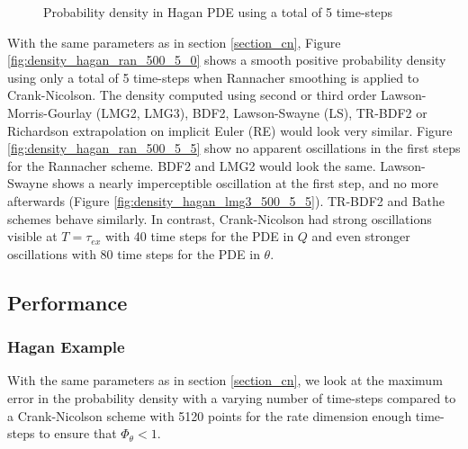 \documentclass[]{rAMF2e}
\begin{document}
\begin{figure}[htb]
\begin{center}
  \end{center}
     \caption{\label{fig:density_hagan_lmg2_500_10} Probability density in Hagan PDE using a total of 5 time-steps}
\end{figure}
With the same parameters as in section \ref{section_cn}, Figure \ref{fig:density_hagan_ran_500_5_0} shows a smooth positive probability density using only a total of 5 time-steps when Rannacher smoothing is applied to Crank-Nicolson. The density computed using second or third order Lawson-Morris-Gourlay (LMG2, LMG3), BDF2, Lawson-Swayne (LS), TR-BDF2 or Richardson extrapolation on implicit Euler (RE) would look very similar. Figure \ref{fig:density_hagan_ran_500_5_5} show no apparent oscillations in the first steps for the Rannacher scheme. BDF2 and LMG2 would look the same.  Lawson-Swayne shows a nearly imperceptible oscillation at the first step, and no more afterwards (Figure \ref{fig:density_hagan_lmg3_500_5_5}). TR-BDF2 and Bathe schemes behave similarly.
In contrast, Crank-Nicolson had strong oscillations visible at $T=\tau_{ex}$ with 40 time steps for the PDE in $Q$ and even stronger oscillations with 80 time steps for the PDE in $\theta$.

\subsection{Performance}
\subsubsection{Hagan Example}
With the same parameters as in section \ref{section_cn}, we look at the maximum error in the probability density with a varying number of time-steps compared to a Crank-Nicolson scheme with 5120 points for the rate dimension enough time-steps to ensure that $\Phi_{\theta} < 1$. 
\end{document}
